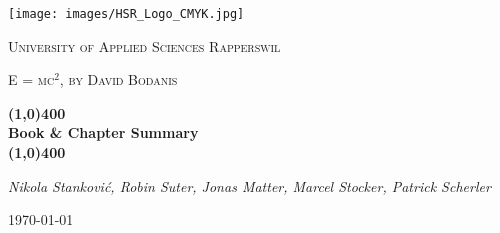 \documentclass[a4paper,12pt]{scrreprt}
\newcommand{\documentauthors}{Nikola Stanković, Robin Suter, Jonas Matter, Marcel Stocker, Patrick Scherler}
\newcommand{\documenttitel}{E = mc$^2$, by David Bodanis}
\newcommand{\documentsubtitel}{Book \& Chapter Summary}
\begin{document}
\author{
  Stanković, Nikola
  \and
  Suter, Robin
  \and
  Matter, Jonas
  \and
  Stocker, Marcel
  \and
  Scherler, Patrick
}

\begin{titlepage}
	\centering
	\texttt{[image: images/HSR\_Logo\_CMYK.jpg]}\par\vspace{1cm}
	{\scshape\LARGE University of Applied Sciences Rapperswil \par}
	\vspace{1cm}
	{\scshape\Large \documenttitel \par}
	\vspace{0.5cm}
	{\huge\bfseries \line(1,0){400} \\ \documentsubtitel \\ \line(1,0){400} \par}
	\vspace{2cm}
	{\Large\itshape \documentauthors \par}

	\vfill

	{\large \today\par}
\end{titlepage}

\tableofcontents








\end{document}

